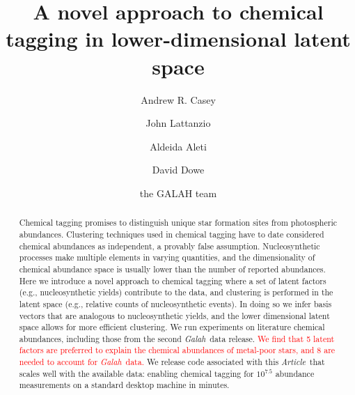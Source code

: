\documentclass[twocolumn]{aastex62}
\newcommand{\project}[1]{\textsl{#1}}
\newcommand{\article}{\emph{Article}}
\newcommand{\Galah}{\project{Galah}}
\newcommand{\todo}[1]{\textcolor{red}{#1}}
\begin{document}
\title{A novel approach to chemical tagging in lower-dimensional latent space}


\author[0000-0003-0174-0564]{Andrew R. Casey}
			 
\author{John Lattanzio}

\author{Aldeida Aleti}

\author{David Dowe}
			 
\author{the GALAH team}


\begin{abstract}
Chemical tagging promises to distinguish unique star formation sites from 
photospheric abundances.
Clustering techniques used in chemical tagging have to date considered 
chemical abundances as independent, a provably false assumption.
Nucleosynthetic processes make multiple elements in varying quantities, and the
dimensionality of chemical abundance space is usually lower than the 
number of reported abundances. 
Here we introduce a novel approach to chemical tagging where a set of 
latent factors (e.g., nucleosynthetic yields) contribute to the
data, and clustering is performed in the latent space (e.g., relative counts of
nucleosynthetic events). In doing so we infer basis vectors that are analogous
to nucleosynthetic yields, and the lower dimensional latent space allows for
more efficient clustering. We run experiments on literature chemical abundances,
including those from the second \Galah\ data release. \todo{We find that 5 latent factors are
preferred to explain the chemical abundances of metal-poor stars, and 8 are
needed to account for \Galah\ data.}
We release code associated with this \article\ that scales well with the 
available data: enabling chemical tagging for $10^{7.5}$ abundance
measurements on a standard desktop machine in minutes.

\end{abstract}
\end{document}
